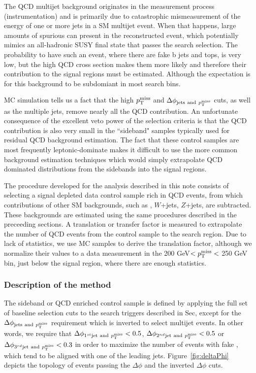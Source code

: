 %
%

The QCD multijet background originates in the measurement process 
(instrumentation) and is primarily due to catastrophic mismeasurement of the energy of 
one or more jets in a SM multijet event. When that happens, large amounts of 
spurious \MET can present in the
reconstructed event, which potentially mimics an all-hadronic SUSY final
state that passes the search selection. The probability to have such an
event, where there are fake b jets and tops, is very low, 
but the high QCD cross section makes them more likely and therefore 
their contribution to the signal regions must be estimated. Although the
expectation is for this background to be subdomiant in most search bins.

MC simulation tells us a fact that the high $p^{\rm miss}_{\rm T}$ and
$\Delta\phi_{\mathrm{jets~and}~p^{\rm miss}_{\rm T}}$ cuts, as well as the multiple jets, 
remove nearly all the QCD contribution. An unfortunate consequence of the excellent veto power of the selection
criteria is that the QCD contribution is also very small 
in the ``sideband" samples typically used for residual QCD background 
estimation. The fact that these control samples are most frequently 
leptonic-\ttbar dominate makes it difficult to use the more common background 
estimation techniques which would simply extrapolate QCD dominated distributions 
from the sidebands into the signal regions. 

The procedure developed for the analysis described in this note consists
of selecting a signal depleted data control sample rich in QCD events, 
from which contributions of other SM backgrounds, such as \ttbar, $W$+jets, 
$Z$+jets, are subtracted. These backgrounds
are estimated using the same procedures described in the preceeding sections.  
A translation or transfer factor is measured to extrapolate the
number of QCD events from the control sample to the 
search region. Due to lack of statistics, we use MC samples to
derive the translation factor, although we normalize their values to a 
data measurement in the 200 GeV$<p^{\rm miss}_{\rm T}<$ 250 GeV bin, just below the 
signal region, where there are enough statistics.

%

\subsubsection{Description of the method}

The sideband or QCD enriched control sample is defined by applying 
the full set of baseline selection cuts to the search triggers described
in Sec, except for the $\Delta\phi_{\mathrm{jets~and}~p^{\rm miss}_{\rm T}}$ 
requirement which is inverted to select multijet events. In other words,
we require that
$\Delta\phi_{1^{st}\mathrm{jet~and}~p^{\rm miss}_{\rm T}} < 0.5$, 
$\Delta\phi_{2^{nd} \mathrm{jet~and}~p^{\rm miss}_{\rm T}} < 0.5$ or 
$\Delta\phi_{3^{rd} \mathrm{jet~and}~p^{\rm miss}_{\rm T}} < 0.3$ in order to maximize the 
number of events with fake \MET, which tend to be aligned with one of the 
leading jets.
Figure~\ref{fig:deltaPhi} depicts the topology of events passing the 
$\Delta\phi$ and the inverted $\Delta\phi$ cuts.

